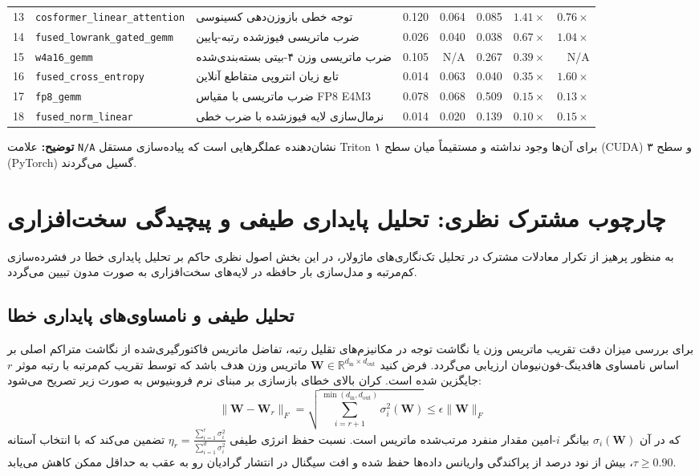 \documentclass[12pt,a4paper]{report}
\theoremstyle{definition}
\begin{document}
\begin{table}[H]
\begin{tabular}{rllrrrrr}
13 & \texttt{cosformer\_linear\_attention} & توجه خطی بازوزن‌دهی کسینوسی & 0.120 & 0.064 & 0.085 & $\mathbf{1.41\times}$ & $0.76\times$ \\
14 & \texttt{fused\_lowrank\_gated\_gemm} & ضرب ماتریسی فیوزشده رتبه-پایین & 0.026 & 0.040 & 0.038 & $0.67\times$ & $\mathbf{1.04\times}$ \\
15 & \texttt{w4a16\_gemm} & ضرب ماتریسی وزن ۴-بیتی بسته‌بندی‌شده & 0.105 & N/A & 0.267 & $0.39\times$ & N/A \\
16 & \texttt{fused\_cross\_entropy} & تابع زیان انتروپی متقاطع آنلاین & 0.014 & 0.063 & 0.040 & $0.35\times$ & $\mathbf{1.60\times}$ \\
17 & \texttt{fp8\_gemm} & ضرب ماتریسی با مقیاس FP8 E4M3 & 0.078 & 0.068 & 0.509 & $0.15\times$ & $0.13\times$ \\
18 & \texttt{fused\_norm\_linear} & نرمال‌سازی لایه فیوزشده با ضرب خطی & 0.014 & 0.020 & 0.139 & $0.10\times$ & $0.15\times$ \\
\bottomrule
\end{tabular}
\par\vspace{2pt}\raggedright\scriptsize \textbf{توضیح:} علامت \texttt{N/A} نشان‌دهنده عملگرهایی است که پیاده‌سازی مستقل Triton برای آن‌ها وجود نداشته و مستقیماً میان سطح ۱ (CUDA) و سطح ۳ (PyTorch) گسیل می‌گردند.
\end{table}

\section{چارچوب مشترک نظری: تحلیل پایداری طیفی و پیچیدگی سخت‌افزاری}
\label{sec:common_spectral_theory}
به منظور پرهیز از تکرار معادلات مشترک در تحلیل تک‌نگاری‌های ماژولار، در این بخش اصول نظری حاکم بر تحلیل پایداری خطا در فشرده‌سازی کم‌مرتبه و مدل‌سازی بار حافظه در لایه‌های سخت‌افزاری به صورت مدون تبیین می‌گردد.

\subsection{تحلیل طیفی و نامساوی‌های پایداری خطا}
برای بررسی میزان دقت تقریب ماتریس وزن یا نگاشت توجه در مکانیزم‌های تقلیل رتبه، تفاضل ماتریس فاکتورگیری‌شده از نگاشت متراکم اصلی بر اساس نامساوی هافدینگ-فون‌نیومان ارزیابی می‌گردد. فرض کنید $\mathbf{W} \in \mathbb{R}^{d_{\text{in}} \times d_{\text{out}}}$ ماتریس وزن هدف باشد که توسط تقریب کم‌مرتبه با رتبه موثر $r$ جایگزین شده است. کران بالای خطای بازسازی بر مبنای نرم فروبنیوس به صورت زیر تصریح می‌شود:
\begin{equation}
\label{eq:spectral_bound_general}
\| \mathbf{W} - \mathbf{W}_{r} \|_F = \sqrt{\sum_{i=r+1}^{\min(d_{\text{in}}, d_{\text{out}})} \sigma_i^2(\mathbf{W})} \le \epsilon \| \mathbf{W} \|_F
\end{equation}
که در آن $\sigma_i(\mathbf{W})$ بیانگر $i$-امین مقدار منفرد مرتب‌شده ماتریس است. نسبت حفظ انرژی طیفی $\eta_r = \frac{\sum_{i=1}^r \sigma_i^2}{\sum_{i=1}^{d} \sigma_i^2}$ تضمین می‌کند که با انتخاب آستانه $\tau \ge 0.90$، بیش از نود درصد از پراکندگی واریانس داده‌ها حفظ شده و افت سیگنال در انتشار گرادیان رو به عقب به حداقل ممکن کاهش می‌یابد.
\end{document}
